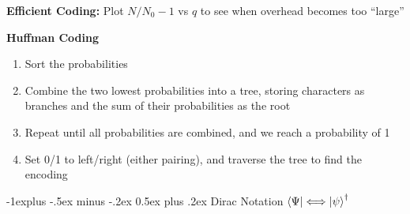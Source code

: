\documentclass[letterpaper, 8pt]{extarticle}
\makeatletter
\renewcommand{\section}{\@startsection{section}{1}{0mm}%
                                {-1explus -.5ex minus -.2ex}%
                                {0.5ex plus .2ex}%
                                {\normalfont\normalsize\bfseries}}
\makeatother
\begin{document}
\begin{multicols*}{5}
    \textbf{Efficient Coding:}
    Plot \(N/N_0 - 1\) vs \(q\) to see when overhead becomes too ``large''

    \textbf{Huffman Coding}
    \begin{enumerate}
        \item Sort the probabilities
        \item Combine the two lowest probabilities into a tree,
              storing characters as branches and the sum of their probabilities as the root
        \item Repeat until all probabilities are combined, and we reach a probability of 1
        \item Set 0/1 to left/right (either pairing), and traverse the tree to find the encoding
    \end{enumerate}

    \section{Dirac Notation}
    \(\bra{\Psi} \Longleftrightarrow \ket{\psi}^\dagger\)


\end{multicols*}
\end{document}
